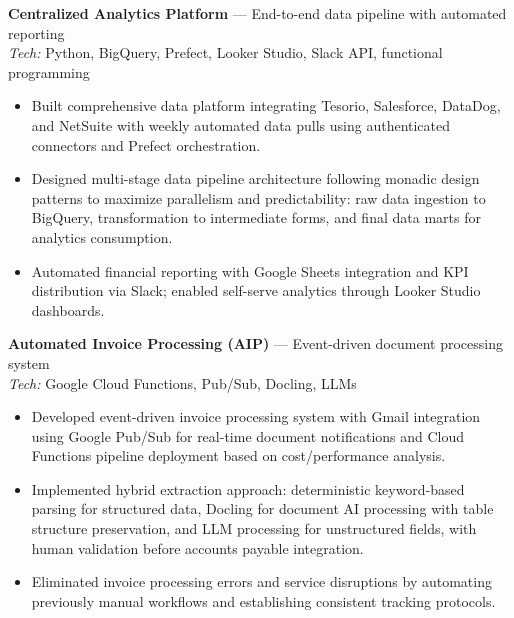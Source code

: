 \documentclass[10pt,letterpaper]{article}
\begin{document}
\clearpage
\begin{samepage}
\textbf{Centralized Analytics Platform} — End-to-end data pipeline with automated reporting \hfill \\
\emph{Tech:} Python, BigQuery, Prefect, Looker Studio, Slack API, functional programming\\[-1.1em]
\begin{itemize}
  \item Built comprehensive data platform integrating Tesorio, Salesforce, DataDog, and NetSuite with weekly automated data pulls using authenticated connectors and Prefect orchestration.
  \item Designed multi-stage data pipeline architecture following monadic design patterns to maximize parallelism and predictability: raw data ingestion to BigQuery, transformation to intermediate forms, and final data marts for analytics consumption.
  \item Automated financial reporting with Google Sheets integration and KPI distribution via Slack; enabled self-serve analytics through Looker Studio dashboards.
\end{itemize}
\end{samepage}

\begin{samepage}
\textbf{Automated Invoice Processing (AIP)} — Event-driven document processing system \hfill \\
\emph{Tech:} Google Cloud Functions, Pub/Sub, Docling, LLMs\\[-1.1em]
\begin{itemize}
  \item Developed event-driven invoice processing system with Gmail integration using Google Pub/Sub for real-time document notifications and Cloud Functions pipeline deployment based on cost/performance analysis.
  \item Implemented hybrid extraction approach: deterministic keyword-based parsing for structured data, Docling for document AI processing with table structure preservation, and LLM processing for unstructured fields, with human validation before accounts payable integration.
  \item Eliminated invoice processing errors and service disruptions by automating previously manual workflows and establishing consistent tracking protocols.
\end{itemize}
\end{samepage}
\end{document}

